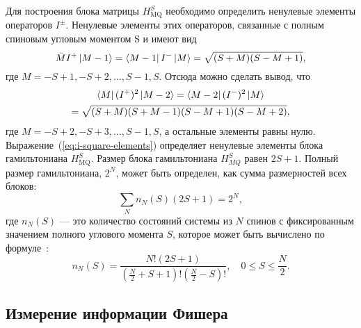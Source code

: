 Для построения блока матрицы $H_\mathrm{MQ}^{S}$ необходимо определить ненулевые элементы операторов $I^{\pm}$.
Ненулевые элементы этих операторов, связанные с полным спиновым угловым моментом S
и имеют вид
%
\begin{equation}
  \bar{M}I^+\left| M-1 \right\rangle = \left\langle M-1 \right|I^-\left| M \right\rangle = \sqrt{(S + M)(S - M + 1)},
\end{equation}
%
где $M = -S+1, -S+2, \dots, S-1, S$. Отсюда можно сделать вывод,
что
%
\begin{multline}\label{eq:i-square-elements}
  \left\langle M \right| (I^+)^2 \left| M-2 \right\rangle
  = \left\langle M-2 \right| (I^-)^2 \left| M \right\rangle \\
  = \sqrt{(S + M)(S + M -1)(S - M + 1)(S - M + 2)},
\end{multline}
%
где $M = -S+2, -S+3, \dots, S-1, S$,
а остальные элементы равны нулю.
Выражение~(\ref{eq:i-square-elements}) определяет ненулевые элементы блока гамильтониана $H_\mathrm{MQ}^{S}$.
Размер блока гамильтониана $H_{MQ}^S$ равен $2S+1$.
Полный размер гамильтониана, $2^N$,
может быть определен, как сумма размерностей всех блоков:
%
\begin{equation}\label{eq:full-dimension}
  \sum\limits_N n_N(S)(2S+1) = 2^N,
\end{equation}
%
где $n_N(S)$ --- это количество состояний системы из $N$ спинов
с фиксированным значением полного углового момента $S$,
которое может быть вычислено по формуле~\cite{Landau3}:
%
\begin{equation}\label{eq:coeff_n}
  n_N(S)  = \dfrac{ N! (2S+1)}
  {(\frac N 2 + S + 1)!(\frac N 2 - S)!},
  \quad
  0\leq S \leq \frac N 2.
\end{equation}
%



\subsection{Измерение информации Фишера}
\label{sec:quantum-fisher-information-mesuarement-at-high-temperature}

